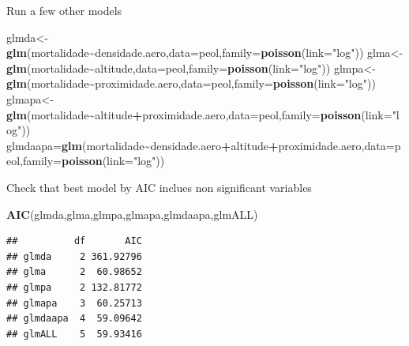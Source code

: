 \documentclass[
]{book}
\newenvironment{Shaded}{\begin{snugshade}}{\end{snugshade}}
\newcommand{\AttributeTok}[1]{\textcolor[rgb]{0.13,0.29,0.53}{#1}}
\newcommand{\FunctionTok}[1]{\textcolor[rgb]{0.13,0.29,0.53}{\textbf{#1}}}
\newcommand{\NormalTok}[1]{#1}
\newcommand{\OtherTok}[1]{\textcolor[rgb]{0.56,0.35,0.01}{#1}}
\newcommand{\SpecialCharTok}[1]{\textcolor[rgb]{0.81,0.36,0.00}{\textbf{#1}}}
\newcommand{\StringTok}[1]{\textcolor[rgb]{0.31,0.60,0.02}{#1}}
\begin{document}
Run a few other models

\begin{Shaded}
\begin{Highlighting}[]
\NormalTok{glmda}\OtherTok{\textless{}{-}}\FunctionTok{glm}\NormalTok{(mortalidade}\SpecialCharTok{\textasciitilde{}}\NormalTok{densidade.aero,}\AttributeTok{data=}\NormalTok{peol,}\AttributeTok{family=}\FunctionTok{poisson}\NormalTok{(}\AttributeTok{link=}\StringTok{"log"}\NormalTok{))}
\NormalTok{glma}\OtherTok{\textless{}{-}}\FunctionTok{glm}\NormalTok{(mortalidade}\SpecialCharTok{\textasciitilde{}}\NormalTok{altitude,}\AttributeTok{data=}\NormalTok{peol,}\AttributeTok{family=}\FunctionTok{poisson}\NormalTok{(}\AttributeTok{link=}\StringTok{"log"}\NormalTok{))}
\NormalTok{glmpa}\OtherTok{\textless{}{-}}\FunctionTok{glm}\NormalTok{(mortalidade}\SpecialCharTok{\textasciitilde{}}\NormalTok{proximidade.aero,}\AttributeTok{data=}\NormalTok{peol,}\AttributeTok{family=}\FunctionTok{poisson}\NormalTok{(}\AttributeTok{link=}\StringTok{"log"}\NormalTok{))}
\NormalTok{glmapa}\OtherTok{\textless{}{-}}\FunctionTok{glm}\NormalTok{(mortalidade}\SpecialCharTok{\textasciitilde{}}\NormalTok{altitude}\SpecialCharTok{+}\NormalTok{proximidade.aero,}\AttributeTok{data=}\NormalTok{peol,}\AttributeTok{family=}\FunctionTok{poisson}\NormalTok{(}\AttributeTok{link=}\StringTok{"log"}\NormalTok{))}
\NormalTok{glmdaapa}\OtherTok{=}\FunctionTok{glm}\NormalTok{(mortalidade}\SpecialCharTok{\textasciitilde{}}\NormalTok{densidade.aero}\SpecialCharTok{+}\NormalTok{altitude}\SpecialCharTok{+}\NormalTok{proximidade.aero,}\AttributeTok{data=}\NormalTok{peol,}\AttributeTok{family=}\FunctionTok{poisson}\NormalTok{(}\AttributeTok{link=}\StringTok{"log"}\NormalTok{))}
\end{Highlighting}
\end{Shaded}

Check that best model by AIC inclues non significant variables

\begin{Shaded}
\begin{Highlighting}[]
\FunctionTok{AIC}\NormalTok{(glmda,glma,glmpa,glmapa,glmdaapa,glmALL)}
\end{Highlighting}
\end{Shaded}

\begin{verbatim}
##          df       AIC
## glmda     2 361.92796
## glma      2  60.98652
## glmpa     2 132.81772
## glmapa    3  60.25713
## glmdaapa  4  59.09642
## glmALL    5  59.93416
\end{verbatim}
\end{document}
